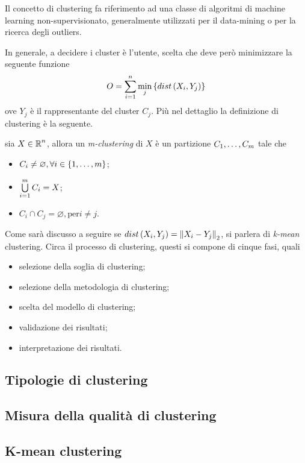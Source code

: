 \documentclass{subfiles}
\begin{document}
Il concetto di clustering fa riferimento ad una classe di algoritmi di machine learning non-supervisionato,
generalmente utilizzati per il data-mining o per la ricerca degli outliers\footnotemark[1].

In generale, a decidere i cluster è l'utente, scelta che deve però minimizzare la seguente funzione
$$
    O = \Sum{\Min*{dist\left(X_{i}, Y_{j}\right)}[j]}{i = 1}[n]
$$
ove $Y_{j}$ è il rappresentante del cluster $C_{j}$.
Più nel dettaglio la definizione di clustering è la seguente.
\begin{Definition*}
    sia $X \in \operatorname{\mathbb{R}}^{n}$, allora un \emph{m-clustering} di $X$ è un partizione ${C}_{1}, \ldots, {C}_{m}$ tale che
    \begin{itemize}
        \item $C_{i} \neq \varnothing, \forall i \in \Set{1, \dots, m}$;
        \item $\Bigcup{C_{i}}{i = 1}[m] = X$;
        \item $C_{i} \cap C_{j} = \varnothing, \text{per} i \neq j$.
    \end{itemize}
\end{Definition*}
Come sarà discusso a seguire se $dist\left(X_{i}, Y_{j}\right) = \Norm{X_{i} - Y_{j}}$, si parlera di \emph{k-mean} clustering.
Circa il processo di clustering, questi si compone di cinque fasi, quali
\begin{itemize}
    \item selezione della soglia di clustering;
    \item selezione della metodologia di clustering;
    \item scelta del modello di clustering;
    \item validazione dei risultati;
    \item interpretazione dei risultati.
\end{itemize}

\subsection{Tipologie di clustering}


\subsection{Misura della qualità di clustering}


\subsection{K-mean clustering}


\end{document}
